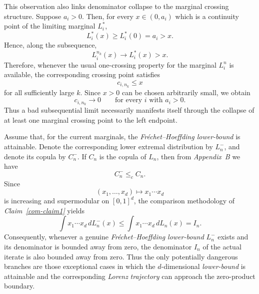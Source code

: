 \documentclass[onecolumn]{article}
\begin{document}
This observation also links denominator collapse to the marginal crossing
structure. Suppose $a_{i}>0$. Then, for every $x\in (0,a_{i})$ which is a
continuity point of the limiting marginal $L_{i}^{\ast }$, 
\begin{equation}
L_{i}^{\ast }(x)\geq L_{i}^{\ast }(0)=a_{i}>x.  \label{4001l}
\end{equation}%
Hence, along the subsequence, 
\begin{equation}
L_{i}^{n_{k}}(x)\longrightarrow L_{i}^{\ast }(x)>x.  \label{4001m}
\end{equation}%
Therefore, whenever the usual one-crossing property for the marginal $%
L_{i}^{n}$ is available, the corresponding crossing point satisfies 
\begin{equation*}
c_{i,n_{k}}\leq x
\end{equation*}%
for all sufficiently large $k$. Since $x>0$ can be chosen arbitrarily small,
we obtain 
\begin{equation}
c_{i,n_{k}}\longrightarrow 0\qquad \text{for every }i\text{ with }a_{i}>0.
\label{4001n}
\end{equation}%
Thus a bad subsequential limit necessarily manifests itself through the
collapse of at least one marginal crossing point to the left endpoint.

Assume that, for the current marginals, the \textit{Fr\'{e}chet--Hoeffding
lower-bound }is attainable. Denote the corresponding lower extremal
distribution by $L_{n}^{-}$, and denote its copula by $C_{n}^{-}$. If $C_{n}$
is the copula of $L_{n}$, then from \textit{Appendix~B} we have 
\begin{equation}
C_{n}^{-}\leq _{c}C_{n}.  \label{4001aa}
\end{equation}%
Since 
\begin{equation}
(x_{1},\ldots ,x_{d})\mapsto x_{1}\cdots x_{d}  \label{4001bb}
\end{equation}%
is increasing and supermodular on $[0,1]^{d}$, the comparison methodology of 
\textit{Claim~\ref{com-claim1}} yields 
\begin{equation}
\int x_{1}\cdots x_{d}\,dL_{n}^{-}(x)\leq \int x_{1}\cdots
x_{d}\,dL_{n}(x)=I_{n}.  \label{4001cc}
\end{equation}%
Consequently, whenever a genuine \textit{Fr\'{e}chet--Hoeffding lower-bound} 
$L_{n}^{-}$ exists and its denominator is bounded away from zero, the
denominator $I_{n}$ of the actual iterate is also bounded away from zero.
Thus the only potentially dangerous branches are those exceptional cases in
which the $d$-dimensional \textit{lower-bound} is attainable and the
corresponding \textit{Lorenz} \textit{trajectory} can approach the
zero-product boundary.
\end{document}
